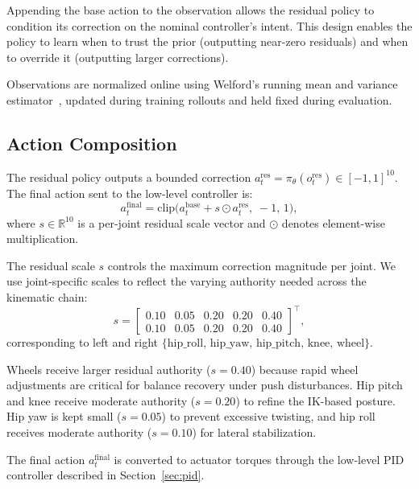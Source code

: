 \documentclass[conference]{IEEEtran}
\begin{document}
Appending the base action to the observation allows the residual policy
to condition its correction on the nominal controller's intent.
This design enables the policy to learn when to trust the prior
(outputting near-zero residuals) and when to override it
(outputting larger corrections).

Observations are normalized online using Welford's running mean and
variance estimator~\cite{welford1962}, updated during training
rollouts and held fixed during evaluation.

\subsection{Action Composition}
\label{sec:action_composition}

The residual policy outputs a bounded correction
$a_t^{\mathrm{res}} = \pi_\theta(o_t^{\mathrm{res}}) \in [-1,1]^{10}$.
The final action sent to the low-level controller is:
\begin{equation}
a_t^{\mathrm{final}} = \mathrm{clip}\!\big(
  a_t^{\mathrm{base}} + s \odot a_t^{\mathrm{res}},\;
  -1,\, 1
\big),
\label{eq:action_composition}
\end{equation}
where $s \in \mathbb{R}^{10}$ is a per-joint residual scale vector
and $\odot$ denotes element-wise multiplication.

The residual scale $s$ controls the maximum correction magnitude
per joint. We use joint-specific scales to reflect the varying
authority needed across the kinematic chain:
\begin{equation}
s = \begin{bmatrix}
  0.10 & 0.05 & 0.20 & 0.20 & 0.40 \\
  0.10 & 0.05 & 0.20 & 0.20 & 0.40
\end{bmatrix}^\top,
\label{eq:residual_scale}
\end{equation}
corresponding to left and right
$\{\text{hip\_roll},\, \text{hip\_yaw},\, \text{hip\_pitch},\,
\text{knee},\, \text{wheel}\}$.

Wheels receive larger residual authority ($s=0.40$) because
rapid wheel adjustments are critical for balance recovery under
push disturbances. Hip pitch and knee receive moderate authority
($s=0.20$) to refine the IK-based posture. Hip yaw is kept small
($s=0.05$) to prevent excessive twisting, and hip roll receives
moderate authority ($s=0.10$) for lateral stabilization.

The final action $a_t^{\mathrm{final}}$ is converted to actuator
torques through the low-level PID controller described in
Section~\ref{sec:pid}.
\end{document}
